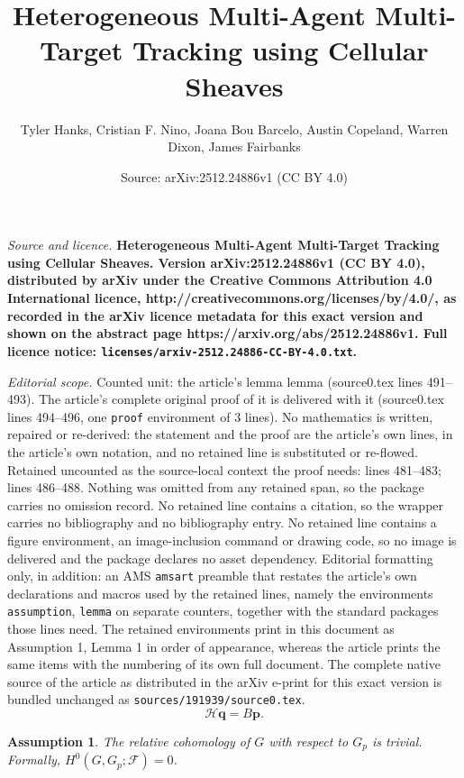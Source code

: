 \documentclass[10pt,a4paper]{amsart}
\title{\LARGE \bf Heterogeneous Multi-Agent Multi-Target Tracking using Cellular Sheaves}
\author{Tyler Hanks, Cristian F. Nino, Joana Bou Barcelo, Austin Copeland, Warren Dixon, James Fairbanks}
\date{Source: arXiv:2512.24886v1 (CC BY 4.0)}
\newtheorem{assumption}{Assumption}
\newcommand{\FF}{\mathcal{F}}
\begin{document}
\maketitle

\noindent\emph{Source and licence.} \LARGE \bf Heterogeneous Multi-Agent Multi-Target Tracking using Cellular Sheaves. Version arXiv:2512.24886v1 (CC BY 4.0), distributed by arXiv under the Creative Commons Attribution 4.0 International licence, http://creativecommons.org/licenses/by/4.0/, as recorded in the arXiv licence metadata for this exact version and shown on the abstract page https://arxiv.org/abs/2512.24886v1. Full licence notice: \texttt{licenses/arxiv-2512.24886-CC-BY-4.0.txt}.\par\smallskip

\noindent\textit{Editorial scope.} Counted unit: the article's lemma lemma (source0.tex lines 491--493). The article's complete original proof of it is delivered with it (source0.tex lines 494--496, one \texttt{proof} environment of 3 lines). No mathematics is written, repaired or re-derived: the statement and the proof are the article's own lines, in the article's own notation, and no retained line is substituted or re-flowed.  Retained uncounted as the source-local context the proof needs: lines 481--483; lines 486--488.  Nothing was omitted from any retained span, so the package carries no omission record.  No retained line contains a citation, so the wrapper carries no bibliography and no bibliography entry.  No retained line contains a figure environment, an image-inclusion command or drawing code, so no image is delivered and the package declares no asset dependency.  Editorial formatting only, in addition: an AMS \texttt{amsart} preamble that restates the article's own declarations and macros used by the retained lines, namely the environments \texttt{assumption}, \texttt{lemma} on separate counters, together with the standard packages those lines need.  The retained environments print in this document as Assumption 1, Lemma 1 in order of appearance, whereas the article prints the same items with the numbering of its own full document.  The complete native source of the article as distributed in the arXiv e-print for this exact version is bundled unchanged as \texttt{sources/191939/source0.tex}.
\begin{equation}\label{eq:harmonic_equation}
    \mathcal{H}\mathbf{q} = B\mathbf{p}.
\end{equation}

\begin{assumption}\label{as:relative_cohom}
    The relative cohomology of $G$ with respect to $G_p$ is trivial. Formally, $H^0(G, G_p;\FF) = 0$.
\end{assumption}
\end{document}
